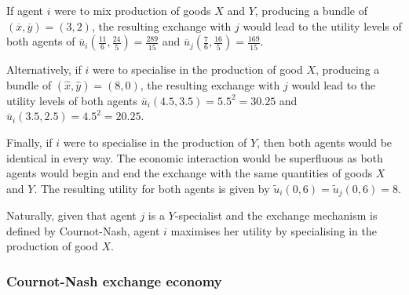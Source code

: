 \begin{example}
If agent $i$ were to mix production of goods $X$ and $Y$, producing a bundle of $(\overline{x}, \overline{y}) = (3,2)$, the resulting exchange with $j$ would lead to the utility levels of both agents of $\overline{u}_{i} \left( \frac{11}{6}, \frac{24}{5} \right) = \frac{289}{15}$ and $\overline{u}_{j} \left( \frac{7}{6}, \frac{16}{5} \right) = \frac{169}{15}$.

Alternatively, if $i$ were to specialise in the production of good $X$, producing a bundle of $(\hat{x}, \hat{y}) = (8,0)$, the resulting exchange with $j$ would lead to the utility levels of both agents $\overline{u}_{i} \left( 4.5, 3.5 \right) = 5.5^2 = 30.25$ and $\overline{u}_{i} \left( 3.5, 2.5 \right) = 4.5^2 = 20.25$.

Finally, if $i$ were to specialise in the production of $Y$, then both agents would be identical in every way. The economic interaction would be superfluous as both agents would begin and end the exchange with the same quantities of goods $X$ and $Y$. The resulting utility for both agents is given by $\tilde{u}_{i} \left( 0, 6 \right) = \tilde{u}_{j} \left( 0, 6 \right) = 8$.

Naturally, given that agent $j$ is a $Y$-specialist and the exchange mechanism is defined by Cournot-Nash, agent $i$ maximises her utility by specialising in the production of good $X$.
\end{example}

\subsubsection{Cournot-Nash exchange economy}


